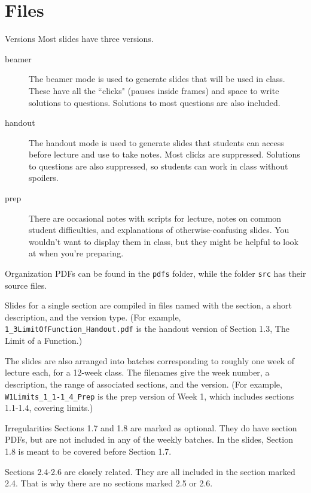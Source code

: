 \documentclass[10pt]{beamer}
\begin{document}
\section{Files}
\frame{\tableofcontents[currentsection]}
\begin{frame}{Versions}
Most slides have three versions.
\begin{description}
\item[beamer] The beamer mode is used to generate slides that will be used in class. These have all the ``clicks" (pauses inside frames) and space to write solutions to questions. Solutions to most questions are also included.
\item[handout] The handout mode is used to generate slides that students can access before lecture and use to take notes. Most clicks are suppressed. Solutions to questions are also suppressed, so students can work in class without spoilers.
\item[prep] There are occasional notes with scripts for lecture, notes on common student difficulties, and explanations of otherwise-confusing slides. You wouldn't want to display them in class, but they might be helpful to look at when you're preparing.
\end{description}
\end{frame}
\begin{frame}{Organization}
PDFs can be found in the \texttt{pdfs} folder, while the folder \texttt{src} has their source files.
\vfill

Slides for a single section are compiled in files named with the section, a short description, and the version type. (For example, \texttt{1\_3LimitOfFunction\_Handout.pdf} is the handout version of Section 1.3, The Limit of a Function.) 

\vfill
The slides are also arranged into batches corresponding to roughly one week of lecture each, for a 12-week class. The filenames give the week number, a description, the range of associated sections, and the version.
(For example, \texttt{W1Limits\_1\_1-1\_4\_Prep} is the prep version of Week 1, which includes sections 1.1-1.4, covering limits.) 
\vfill
\end{frame}
\begin{frame}{Irregularities}
Sections 1.7 and 1.8 are marked as optional. They do have section PDFs, but are not included in any of the weekly batches. In the slides, Section 1.8 is meant to be covered before Section 1.7.\vfill

Sections 2.4-2.6 are closely related. They are all included in the section marked 2.4. That is why there are no sections marked 2.5 or 2.6.\vfill
\end{frame}
\end{document}
